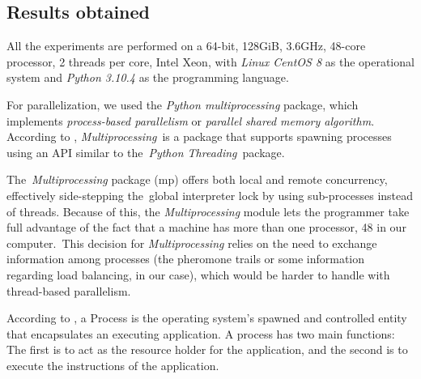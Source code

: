 \documentclass[preprint,authoryear]{elsarticle}
\begin{document}
\subsection{Results obtained}


All the experiments are performed on a 64-bit, 128GiB, 3.6GHz, 48-core processor, 2 threads per core, Intel Xeon, with {\it Linux CentOS 8} as the operational system and {\it Python 3.10.4}\/ as the programming language.

For parallelization, we used the {\it Python multiprocessing} package, which implements {\it process-based parallelism} or {\it parallel shared memory algorithm}. According to \cite{multiprocessing}, {\it Multiprocessing} is a package that supports spawning processes using an API similar to the {\it Python Threading} package.

The {\it Multiprocessing} package (mp) offers both local and remote concurrency, effectively side-stepping the global interpreter lock by using sub-processes instead of threads. Because of this, the {\it Multiprocessing} module lets the programmer take full advantage of the fact that a machine has more than one processor, 48 in our computer. This decision for {\it Multiprocessing} relies on the need to exchange information among processes (the pheromone trails or some information regarding load balancing, in our case), which would be harder to handle with thread-based parallelism.

According to \cite[p.271]{Breshears2009}, a Process is the operating system’s spawned and controlled entity that encapsulates an executing application. A process has two main functions: The first is to act as the resource holder for the application, and the second is to execute the instructions of the application.

\vspace{2.0mm}
\end{document}
